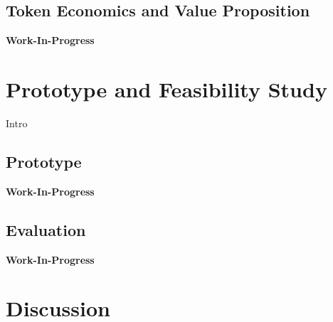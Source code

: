 \documentclass{llncs}
\begin{document}
{		%

		\subsection{Token Economics and Value Proposition}

			\textbf{Work-In-Progress}
					


	\section{Prototype and Feasibility Study}
		\label{s:section-6}	
			
		Intro
		
		
		\subsection{Prototype}
			\label{ss:protoype}				

			\textbf{Work-In-Progress}
			
					
		
		\subsection{Evaluation}
			\label{ss:evaluation}				

			\textbf{Work-In-Progress}
			
					


	\section{Discussion}
		\label{s:section-7}	
		
}
\end{document}
